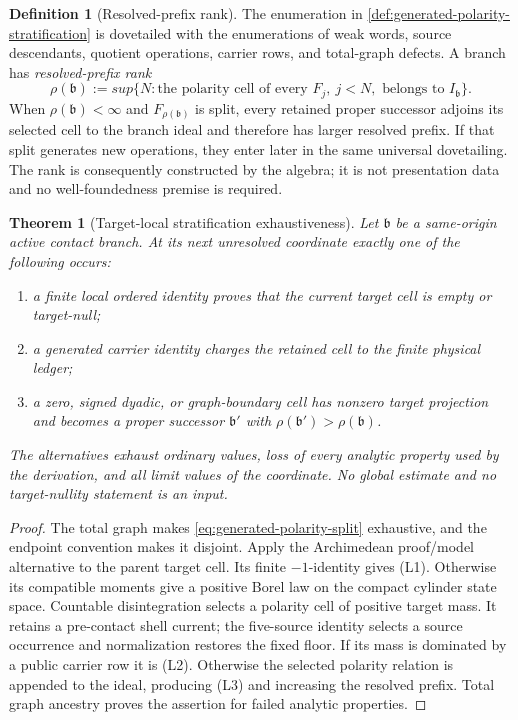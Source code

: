 \documentclass[11pt]{article}
\numberwithin{section}{part}
\theoremstyle{plain}
\newtheorem{theorem}{Theorem}[section]
\theoremstyle{definition}
\newtheorem{definition}[definition]{Definition}
\theoremstyle{remark}
\begin{document}
\begin{definition}[Resolved-prefix rank]
\label{def:resolved-prefix-rank}
The enumeration in
\cref{def:generated-polarity-stratification} is dovetailed with the
enumerations of weak words, source descendants, quotient operations, carrier
rows, and total-graph defects.  A branch has \emph{resolved-prefix rank}
\begin{equation}
 \label{eq:resolved-prefix-rank}
 \rho(\mathfrak b):=sup\{N:\text{the polarity cell of every }F_j,
                         \ j<N,\text{ belongs to }I_{\mathfrak b}\}.
\end{equation}
When \(\rho(\mathfrak b)<\infty\) and
\(F_{\rho(\mathfrak b)}\) is split, every retained proper successor
adjoins its selected cell to the branch ideal and therefore has larger
resolved prefix.  If that split generates new operations, they enter later
in the same universal dovetailing.  The rank is consequently constructed by
the algebra; it is not presentation data and no well-foundedness premise is
required.
\end{definition}

\begin{theorem}[Target-local stratification exhaustiveness]
\label{thm:target-local-stratification-exhaustiveness}
Let \(\mathfrak b\) be a same-origin active contact branch.  At its next
unresolved coordinate exactly one of the following occurs:
\begin{enumerate}[label=\textup{(L\arabic*)}]
\item a finite local ordered identity proves that the current target cell is
empty or target-null;
\item a generated carrier identity charges the retained cell to the finite
physical ledger;
\item a zero, signed dyadic, or graph-boundary cell has nonzero target
projection and becomes a proper successor \(\mathfrak b'\) with
\(\rho(\mathfrak b')>\rho(\mathfrak b)\).
\end{enumerate}
The alternatives exhaust ordinary values, loss of every analytic property
used by the derivation, and all limit values of the coordinate.  No global
estimate and no target-nullity statement is an input.
\end{theorem}

\begin{proof}
The total graph makes \eqref{eq:generated-polarity-split} exhaustive, and the
endpoint convention makes it disjoint.  Apply the Archimedean proof/model
alternative to the parent target cell.  Its finite \(-1\)-identity gives
\textup{(L1)}.  Otherwise its compatible moments give a positive Borel law on
the compact cylinder state space.  Countable
disintegration selects a polarity cell of positive target mass.  It retains
a pre-contact shell current; the five-source identity selects a source
occurrence and normalization restores the fixed floor.  If its mass is
dominated by a public carrier row it is \textup{(L2)}.  Otherwise the selected
polarity relation is appended to the ideal, producing \textup{(L3)} and
increasing the resolved prefix.  Total graph ancestry proves the assertion
for failed analytic properties.
\end{proof}
\end{document}
